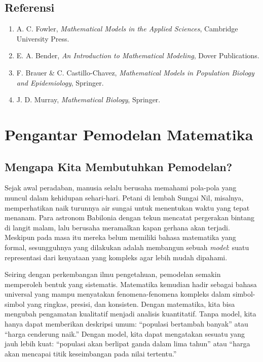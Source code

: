 \documentclass{bukumjh}
\begin{document}
\endgroup

\section*{Referensi}
\begin{enumerate}
    \item A. C. Fowler, \textit{Mathematical Models in the Applied Sciences}, Cambridge University Press.
    \item E. A. Bender, \textit{An Introduction to Mathematical Modeling}, Dover Publications.
    \item F. Brauer \& C. Castillo-Chavez, \textit{Mathematical Models in Population Biology and Epidemiology}, Springer.
    \item J. D. Murray, \textit{Mathematical Biology}, Springer.
\end{enumerate}


\tableofcontents


\mainmatter

\chapter{Pengantar Pemodelan Matematika}

\section{Mengapa Kita Membutuhkan Pemodelan?}

Sejak awal peradaban, manusia selalu berusaha memahami pola-pola yang muncul dalam kehidupan sehari-hari. Petani di lembah Sungai Nil, misalnya, memperhatikan naik turunnya air sungai untuk menentukan waktu yang tepat menanam. Para astronom Babilonia dengan tekun mencatat pergerakan bintang di langit malam, lalu berusaha meramalkan kapan gerhana akan terjadi. Meskipun pada masa itu mereka belum memiliki bahasa matematika yang formal, sesungguhnya yang dilakukan adalah membangun sebuah \textit{model}: suatu representasi dari kenyataan yang kompleks agar lebih mudah dipahami.

Seiring dengan perkembangan ilmu pengetahuan, pemodelan semakin memperoleh bentuk yang sistematis. Matematika kemudian hadir sebagai bahasa universal yang mampu menyatakan fenomena-fenomena kompleks dalam simbol-simbol yang ringkas, presisi, dan konsisten. Dengan matematika, kita bisa mengubah pengamatan kualitatif menjadi analisis kuantitatif. Tanpa model, kita hanya dapat memberikan deskripsi umum: “populasi bertambah banyak” atau “harga cenderung naik.” Dengan model, kita dapat mengatakan sesuatu yang jauh lebih kuat: “populasi akan berlipat ganda dalam lima tahun” atau “harga akan mencapai titik keseimbangan pada nilai tertentu.” 
\end{document}
